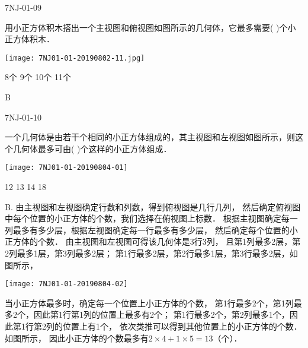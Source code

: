 \begin{defproblem}{7NJ-01-09}%
\begin{onlyproblem}%
用小正方体积木搭出一个主视图和俯视图如图所示的几何体，它最多需要(    )个小正方体积木．
\begin{center}
\texttt{[image: 7NJ01-01-20190802-11.jpg]}
\end{center}

\xx
{8个}
{9个}
{10个}
{11个}


\end{onlyproblem}%
\begin{onlysolution}%
\begin{solution}%
B
\end{solution}%
\end{onlysolution}%
\end{defproblem}




\begin{defproblem}{7NJ-01-10}%
\begin{onlyproblem}%
一个几何体是由若干个相同的小正方体组成的，其主视图和左视图如图所示，则这个几何体最多可由(    )个这样的小正方体组成． 
\begin{center}
\texttt{[image: 7NJ01-01-20190804-01]}
\end{center}

\xx
{12}
{13}
{14}
{18}

\end{onlyproblem}%
\begin{onlysolution}%
\begin{solution}%
B. 
由主视图和左视图确定行数和列数，得到俯视图是几行几列， 然后确定俯视图中每个位置的小正方体的个数，我们选择在俯视图上标数． 根据主视图确定每一列最多有多少层，根据左视图确定每一行最多有多少层， 然后确定每个位置的小正方体的个数． 由主视图和左视图可得该几何体是3行3列， 且第1列最多2层，第2列最多1层，第3列最多2层； 第1行最多2层，第2行最多1层，第3行最多2层，如图所示，
\begin{center}
\texttt{[image: 7NJ01-01-20190804-02]}
\end{center}
当小正方体最多时，确定每一个位置上小正方体的个数， 第1行最多2个，第1列最多2个，因此第1行第1列的位置上最多有2个； 第1行最多2个，第2列最多1个，因此第1行第2列的位置上有1个， 依次类推可以得到其他位置上的小正方体的个数．如图所示，   因此小正方体的个数最多有$2\times4+1\times5=13$（个）． 
\end{solution}%
\end{onlysolution}%
\end{defproblem}






